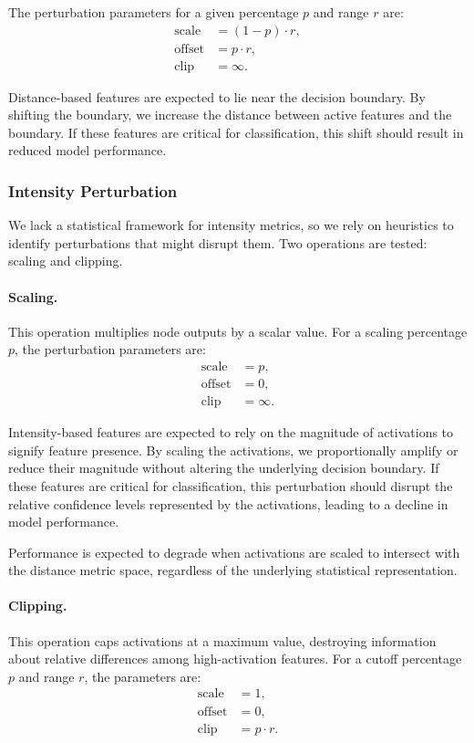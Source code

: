 The perturbation parameters for a given percentage $p$ and range $r$ are:
\begin{align}
    \text{scale} &= (1 - p) \cdot r, \\
    \text{offset} &= p \cdot r, \\
    \text{clip} &= \infty.
\end{align}

Distance-based features are expected to lie near the decision boundary. By shifting the boundary, we increase the distance between active features and the boundary. If these features are critical for classification, this shift should result in reduced model performance.

\subsubsection{Intensity Perturbation}

We lack a statistical framework for intensity metrics, so we rely on heuristics to identify perturbations that might disrupt them. Two operations are tested: scaling and clipping.

\paragraph{Scaling.} This operation multiplies node outputs by a scalar value. For a scaling percentage $p$, the perturbation parameters are:
\begin{align}
    \text{scale} &= p, \\
    \text{offset} &= 0, \\
    \text{clip} &= \infty.
\end{align}

Intensity-based features are expected to rely on the magnitude of activations to signify feature presence. By scaling the activations, we proportionally amplify or reduce their magnitude without altering the underlying decision boundary. If these features are critical for classification, this perturbation should disrupt the relative confidence levels represented by the activations, leading to a decline in model performance.

Performance is expected to degrade when activations are scaled to intersect with the distance metric space, regardless of the underlying statistical representation.


\paragraph{Clipping.} This operation caps activations at a maximum value, destroying information about relative differences among high-activation features. For a cutoff percentage $p$ and range $r$, the parameters are:
\begin{align}
    \text{scale} &= 1, \\
    \text{offset} &= 0, \\
    \text{clip} &= p \cdot r.
\end{align}

